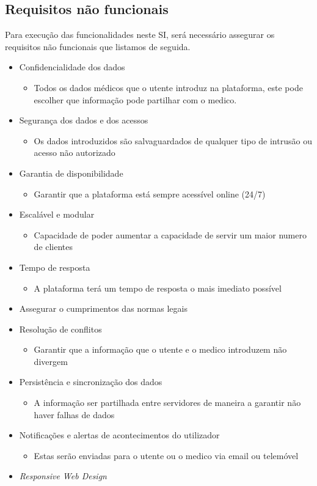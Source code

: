 \documentclass[12pt, a4paper, twoside]{report} %
\begin{document}

\subsection{Requisitos não funcionais}

Para execução das funcionalidades neste SI, será necessário assegurar os requisitos não funcionais que listamos de seguida.

\begin{itemize}
\item Confidencialidade dos dados
	\begin{itemize}
	\item Todos os dados médicos que o utente introduz na plataforma, este pode escolher que informação pode partilhar com o medico.
	\end{itemize}
\item Segurança dos dados e dos acessos
	\begin{itemize}
	\item Os dados introduzidos são salvaguardados de qualquer tipo de intrusão ou acesso não autorizado
	\end{itemize}
\item Garantia de disponibilidade
\begin{itemize}
\item Garantir que a plataforma está sempre acessível online (24/7)
\end{itemize}
\item Escalável e modular
\begin{itemize}
\item Capacidade de poder aumentar a capacidade de servir um maior numero de clientes
\end{itemize}
\item Tempo de resposta
\begin{itemize}
\item A plataforma terá um tempo de resposta o mais imediato possível
\end{itemize}
\item Assegurar o cumprimentos das normas legais
\item Resolução de conflitos
\begin{itemize}
\item Garantir que a informação que o utente e o medico introduzem não divergem
\end{itemize}
\item Persistência e sincronização dos dados
\begin{itemize}
\item A informação ser partilhada entre servidores de maneira a garantir não haver falhas de dados
\end{itemize}
\item Notificações e alertas de acontecimentos do utilizador
\begin{itemize}
\item Estas serão enviadas para o utente ou o medico via email ou telemóvel
\end{itemize}
\item \textit {Responsive Web Design}
\end{itemize}
\end{document}
